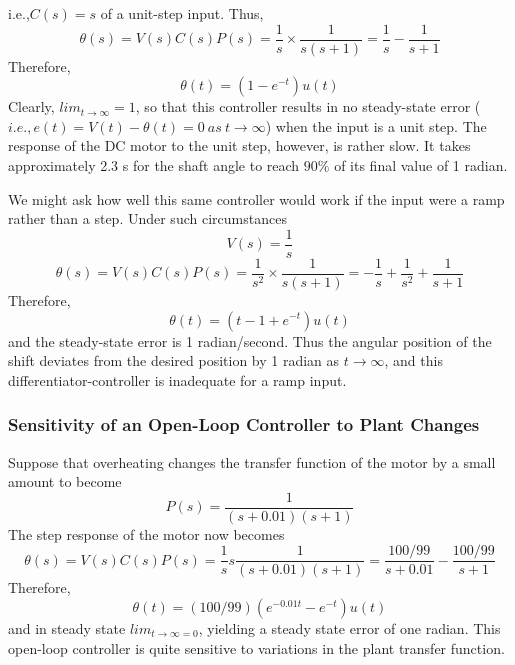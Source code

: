 \documentclass{article}
\begin{document}
{{{            i.e.,$C(s)=s$ of a unit-step input. Thus,
            \begin{equation}
                \theta(s)=V(s) C(s) P(s)=\frac{1}{s}\times \frac{1}{s(s+1)}=\frac{1}{s}-\frac{1}{s+1}
                \label{eq:eq8}
            \end{equation}
            Therefore, 
            \begin{equation}
                \theta(t)=\left(1-e^{-t}\right)u(t)
            \end{equation}
            Clearly, $lim_{t\rightarrow \infty} = 1$, so that this controller results in no steady-state error ($i.e., e(t) = V (t) − \theta (t) = 0\ as\ t\rightarrow \infty$) when the input is a unit step. The response of the DC motor to the unit step, however, is rather slow. It takes approximately 2.3 s for the shaft angle to reach $90\%$ of its final value of 1 radian.

            We might ask how well this same controller would work if the input were a ramp rather than a step. Under such circumstances
            \begin{equation}
                V(s) = \frac{1}{s}
            \end{equation}
            \begin{equation}
                \theta(s)=V(s) C(s) P(s)=\frac{1}{s^{2}}\times \frac{1}{s(s+1)}=-\frac{1}{s}+\frac{1}{s^{2}}+\frac{1}{s+1}
            \end{equation}
            Therefore,
            \begin{equation}
                \theta(t)=\left(t-1+e^{-t}\right) u(t)
            \end{equation}
            and the steady-state error is 1 radian/second. Thus the angular position of the shift deviates from the desired position by 1 radian as $t\rightarrow \infty$, and this differentiator-controller is inadequate for a ramp input.
        }

        \subsubsection{Sensitivity of an Open-Loop Controller to Plant Changes}
        {
            Suppose that overheating changes the transfer function of the motor by a small amount to become
            \begin{equation}
                P(s)=\frac{1}{(s+0.01)(s+1)}
            \end{equation}
            The step response of the motor now becomes
            \begin{equation}
                \theta(s)=V(s) C(s) P(s)=\frac{1}{s} s \frac{1}{(s+0.01)(s+1)}=\frac{100 / 99}{s+0.01}-\frac{100 / 99}{s+1}
            \end{equation}
            Therefore,
            \begin{equation}
                \theta(t)=(100 / 99)\left(e^{-0.01 t}-e^{-t}\right) u(t)
            \end{equation}
            and in steady state $lim_{t\rightarrow \infty=0}$, yielding a steady state error of one radian. This open-loop controller is quite sensitive to variations in the plant transfer function.

}}}
\end{document}
